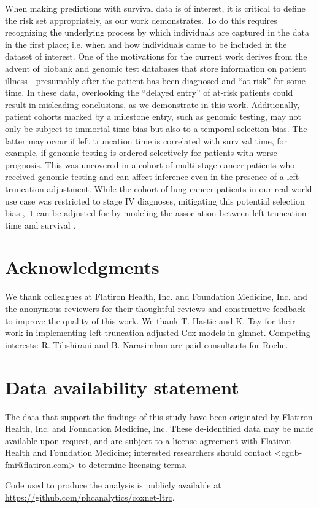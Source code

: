 \documentclass[11pt,final,fleqn]{article}\usepackage[]{graphicx}\usepackage[]{color}
\theoremstyle{plain}
\newcommand{\pkg}[1]{{\fontseries{b}\selectfont #1}}
\begin{document}
When making predictions with survival data is of interest, it is critical to define the risk set appropriately, as our work demonstrates. To do this requires recognizing the underlying process by which individuals are captured in the data in the first place; i.e. when and how individuals came to be included in the dataset of interest. One of the motivations for the current work derives from the advent of biobank and genomic test databases that store information on patient illness - presumably after the patient has been diagnosed and ``at risk'' for some time. In these data, overlooking the ``delayed entry'' of at-risk patients could result in misleading conclusions, as we demonstrate in this work. Additionally, patient cohorts marked by a milestone entry, such as genomic testing, may not only be subject to immortal time bias but also to a temporal selection bias. The latter may occur if left truncation time is correlated with survival time, for example, if genomic testing is ordered selectively for patients with worse prognosis. This was uncovered in a cohort of multi-stage cancer patients who received genomic testing \cite{kehl2020selectionbias} and can affect inference even in the presence of a left truncation adjustment. While the cohort of lung cancer patients in our real-world use case was restricted to stage IV diagnoses, mitigating this potential selection bias \cite{kehl2020selectionbias}, it can be adjusted for by modeling the association between left truncation time and survival \cite{thiebaut2004choice, chiou2019transformation}.

\section*{Acknowledgments} 
We thank colleagues at Flatiron Health, Inc. and Foundation Medicine, Inc. and the anonymous reviewers for their thoughtful reviews and constructive feedback to improve the quality of this work. We thank T. Hastie and K. Tay for their work in implementing left truncation-adjusted Cox models in \pkg{glmnet}. 
Competing interests: R. Tibshirani and B. Narasimhan are paid consultants for Roche. 

\section*{Data availability statement}
The data that support the findings of this study have been originated by Flatiron Health, Inc. and Foundation Medicine, Inc. These de-identified data may be made available upon request, and are subject to a license agreement with Flatiron Health and Foundation Medicine; interested researchers should contact <cgdb-fmi@flatiron.com> to determine licensing terms.

Code used to produce the analysis is publicly available at \url{https://github.com/phcanalytics/coxnet-ltrc}.


\end{document}
